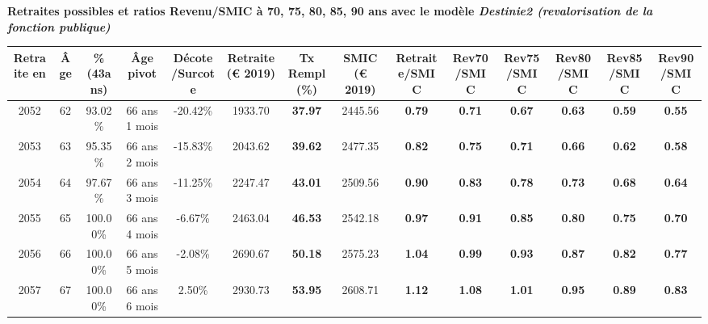  \vspace{0.1cm} 
{\bf \noindent Retraites possibles et ratios Revenu/SMIC à 70, 75, 80, 85, 90 ans avec le modèle \emph{Destinie2 (revalorisation de la fonction publique)}}  
 
\begin{adjustbox}{max width=\textwidth} 
\begin{tabular}[htb]{|c|c||c|c|c||c|c||c||c|c|c|c|c|c|} 
\hline 
 Retraite en &  Âge &  \%(43ans) &  Âge pivot &  Décote/Surcote &  Retraite (\euro{} 2019) &  Tx Rempl(\%) &  SMIC (\euro{} 2019) &  Retraite/SMIC &  Rev70/SMIC &  Rev75/SMIC &  Rev80/SMIC &  Rev85/SMIC &  Rev90/SMIC \\ 
\hline \hline 
 2052 &  62 &  93.02\% &  66 ans 1 mois &  -20.42\% &  1933.70 &  {\bf 37.97} &  2445.56 &  {\bf {\color{red} 0.79}} &  {\bf {\color{red} 0.71}} &  {\bf {\color{red} 0.67}} &  {\bf {\color{red} 0.63}} &  {\bf {\color{red} 0.59}} &  {\bf {\color{red} 0.55}} \\ 
\hline 
 2053 &  63 &  95.35\% &  66 ans 2 mois &  -15.83\% &  2043.62 &  {\bf 39.62} &  2477.35 &  {\bf {\color{red} 0.82}} &  {\bf {\color{red} 0.75}} &  {\bf {\color{red} 0.71}} &  {\bf {\color{red} 0.66}} &  {\bf {\color{red} 0.62}} &  {\bf {\color{red} 0.58}} \\ 
\hline 
 2054 &  64 &  97.67\% &  66 ans 3 mois &  -11.25\% &  2247.47 &  {\bf 43.01} &  2509.56 &  {\bf {\color{red} 0.90}} &  {\bf {\color{red} 0.83}} &  {\bf {\color{red} 0.78}} &  {\bf {\color{red} 0.73}} &  {\bf {\color{red} 0.68}} &  {\bf {\color{red} 0.64}} \\ 
\hline 
 2055 &  65 &  100.00\% &  66 ans 4 mois &  -6.67\% &  2463.04 &  {\bf 46.53} &  2542.18 &  {\bf {\color{red} 0.97}} &  {\bf {\color{red} 0.91}} &  {\bf {\color{red} 0.85}} &  {\bf {\color{red} 0.80}} &  {\bf {\color{red} 0.75}} &  {\bf {\color{red} 0.70}} \\ 
\hline 
 2056 &  66 &  100.00\% &  66 ans 5 mois &  -2.08\% &  2690.67 &  {\bf 50.18} &  2575.23 &  {\bf 1.04} &  {\bf {\color{red} 0.99}} &  {\bf {\color{red} 0.93}} &  {\bf {\color{red} 0.87}} &  {\bf {\color{red} 0.82}} &  {\bf {\color{red} 0.77}} \\ 
\hline 
 2057 &  67 &  100.00\% &  66 ans 6 mois &  2.50\% &  2930.73 &  {\bf 53.95} &  2608.71 &  {\bf 1.12} &  {\bf 1.08} &  {\bf 1.01} &  {\bf {\color{red} 0.95}} &  {\bf {\color{red} 0.89}} &  {\bf {\color{red} 0.83}} \\ 
\hline 
\hline 
\end{tabular} 
\end{adjustbox} 
 
